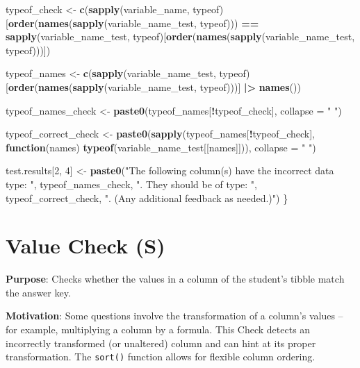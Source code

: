\documentclass[
  12pt,
]{book}
\newenvironment{Shaded}{\begin{snugshade}}{\end{snugshade}}
\newcommand{\AttributeTok}[1]{\textcolor[rgb]{0.13,0.29,0.53}{#1}}
\newcommand{\ControlFlowTok}[1]{\textcolor[rgb]{0.13,0.29,0.53}{\textbf{#1}}}
\newcommand{\DecValTok}[1]{\textcolor[rgb]{0.00,0.00,0.81}{#1}}
\newcommand{\FunctionTok}[1]{\textcolor[rgb]{0.13,0.29,0.53}{\textbf{#1}}}
\newcommand{\NormalTok}[1]{#1}
\newcommand{\OtherTok}[1]{\textcolor[rgb]{0.56,0.35,0.01}{#1}}
\newcommand{\SpecialCharTok}[1]{\textcolor[rgb]{0.81,0.36,0.00}{\textbf{#1}}}
\newcommand{\StringTok}[1]{\textcolor[rgb]{0.31,0.60,0.02}{#1}}
\begin{document}
\begin{Shaded}
\begin{Highlighting}[]
\NormalTok{  typeof\_check }\OtherTok{\textless{}{-}} \FunctionTok{c}\NormalTok{(}\FunctionTok{sapply}\NormalTok{(variable\_name, typeof)[}\FunctionTok{order}\NormalTok{(}\FunctionTok{names}\NormalTok{(}\FunctionTok{sapply}\NormalTok{(variable\_name\_test, typeof))) }\SpecialCharTok{==}
                    \FunctionTok{sapply}\NormalTok{(variable\_name\_test, typeof)[}\FunctionTok{order}\NormalTok{(}\FunctionTok{names}\NormalTok{(}\FunctionTok{sapply}\NormalTok{(variable\_name\_test, typeof)))]) }
  
\NormalTok{  typeof\_names }\OtherTok{\textless{}{-}} \FunctionTok{c}\NormalTok{(}\FunctionTok{sapply}\NormalTok{(variable\_name\_test, typeof)[}\FunctionTok{order}\NormalTok{(}\FunctionTok{names}\NormalTok{(}\FunctionTok{sapply}\NormalTok{(variable\_name\_test, typeof)))] }\SpecialCharTok{|\textgreater{}} \FunctionTok{names}\NormalTok{())}
    
\NormalTok{  typeof\_names\_check }\OtherTok{\textless{}{-}} \FunctionTok{paste0}\NormalTok{(typeof\_names[}\SpecialCharTok{!}\NormalTok{typeof\_check], }\AttributeTok{collapse =} \StringTok{" "}\NormalTok{)}
    
\NormalTok{  typeof\_correct\_check }\OtherTok{\textless{}{-}} \FunctionTok{paste0}\NormalTok{(}\FunctionTok{sapply}\NormalTok{(typeof\_names[}\SpecialCharTok{!}\NormalTok{typeof\_check], }\ControlFlowTok{function}\NormalTok{(names) }\FunctionTok{typeof}\NormalTok{(variable\_name\_test[[names]])), }\AttributeTok{collapse =} \StringTok{" "}\NormalTok{)}
    
\NormalTok{  test.results[}\DecValTok{2}\NormalTok{, }\DecValTok{4}\NormalTok{] }\OtherTok{\textless{}{-}} \FunctionTok{paste0}\NormalTok{(}\StringTok{"The following column(s) have the incorrect data type: "}\NormalTok{, typeof\_names\_check, }\StringTok{". They should be of type: "}\NormalTok{, typeof\_correct\_check, }\StringTok{". (Any additional feedback as needed.)"}\NormalTok{)}
\NormalTok{\}}
\end{Highlighting}
\end{Shaded}

\section{Value Check (S)}\label{Value-Check}

\textbf{Purpose}: Checks whether the values in a column of the student's tibble match the answer key.

\textbf{Motivation}: Some questions involve the transformation of a column's values -- for example, multiplying a column by a formula. This Check detects an incorrectly transformed (or unaltered) column and can hint at its proper transformation. The \texttt{sort()} function allows for flexible column ordering.
\end{document}
